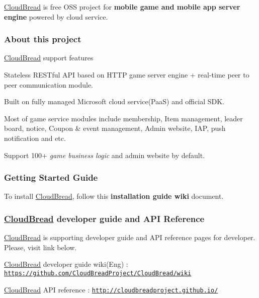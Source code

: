 \hyperlink{a00217}{Cloud\+Bread} is free O\+SS project for {\bfseries mobile game and mobile app server engine} powered by cloud service.

\href{https://ci.appveyor.com/project/CloudBreadPaPa/cloudbread}{\tt }

\subsubsection*{About this project}

\hyperlink{a00217}{Cloud\+Bread} support features
\begin{DoxyItemize}
\item Stateless R\+E\+S\+Tful A\+PI based on H\+T\+TP game server engine + real-\/time peer to peer communication module.
\item Built on fully managed Microsoft cloud service(\+Paa\+S) and official S\+DK.
\item Most of game service modules include membership, Item management, leader board, notice, Coupon \& event management, Admin website, I\+AP, push notification and etc.
\item Support 100+ {\itshape game business logic} and admin website by default.
\end{DoxyItemize}

\subsubsection*{Getting Started Guide}

To install \hyperlink{a00217}{Cloud\+Bread}, follow this {\bfseries installation guide wiki} document.

\subsubsection*{\hyperlink{a00217}{Cloud\+Bread} developer guide and A\+PI Reference}

\hyperlink{a00217}{Cloud\+Bread} is supporting developer guide and A\+PI reference pages for developer. Please, visit link below.
\begin{DoxyItemize}
\item \hyperlink{a00217}{Cloud\+Bread} developer guide wiki(\+Eng) \+: \href{https://github.com/CloudBreadProject/CloudBread/wiki}{\tt https\+://github.\+com/\+Cloud\+Bread\+Project/\+Cloud\+Bread/wiki}
\item \hyperlink{a00217}{Cloud\+Bread} A\+PI reference \+: \href{http://cloudbreadproject.github.io/}{\tt http\+://cloudbreadproject.\+github.\+io/}
\end{DoxyItemize}

